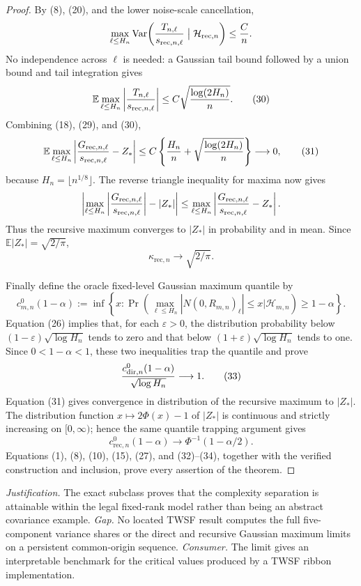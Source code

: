 \documentclass{article}
\begin{document}
\begin{proof}
By (8), (20), and the lower noise-scale cancellation,
\[
 \max_{\ell\leq H_n}
 \operatorname{Var}\!\left(
 {T_{n,\ell}\over s_{\mathrm{rec},n,\ell}}
 \mathrel{\big|}\mathcal H_{\mathrm{rec},n}\right)
 \leq {C\over n}.
\]
No independence across \(\ell\) is needed: a Gaussian tail bound followed by a union bound and tail integration gives
\[
 \mathbb E\max_{\ell\leq H_n}
 \left|{T_{n,\ell}\over s_{\mathrm{rec},n,\ell}}\right|
 \leq C\sqrt{{\log(2H_n)\over n}}.
 \tag{30}
\]
Combining (18), (29), and (30),
\[
 \mathbb E\max_{\ell\leq H_n}
 \left|{G_{\mathrm{rec},n,\ell}\over s_{\mathrm{rec},n,\ell}}-Z_*\right|
 \leq C\left\{{H_n\over n}
       +\sqrt{{\log(2H_n)\over n}}\right\}\longrightarrow0,
 \tag{31}
\]
because \(H_n=\lfloor n^{1/8}\rfloor\).  The reverse triangle inequality for maxima now gives
\[
 \left|\max_{\ell\leq H_n}
 \left|{G_{\mathrm{rec},n,\ell}\over s_{\mathrm{rec},n,\ell}}\right|-|Z_*|\right|
 \leq\max_{\ell\leq H_n}
 \left|{G_{\mathrm{rec},n,\ell}\over s_{\mathrm{rec},n,\ell}}-Z_*\right|.
\]
Thus the recursive maximum converges to \(|Z_*|\) in probability and in mean.  Since \(\mathbb E|Z_*|=\sqrt{2/\pi}\),
\[
 \kappa_{\mathrm{rec},n}\longrightarrow\sqrt{2/\pi}.
 \tag{32}
\]

Finally define the oracle fixed-level Gaussian maximum quantile by
\[
 c^0_{m,n}(1-\alpha)
 :=\inf\left\{x:\Pr\!\left(
 \max_{\ell\leq H_n}|N(0,R_{m,n})_\ell|\leq x
 \mathrel{\big|}\mathcal H_{m,n}\right)\geq1-\alpha\right\}.
\]
Equation (26) implies that, for each \(\varepsilon>0\), the distribution probability below \((1-\varepsilon)\sqrt{\log H_n}\) tends to zero and that below \((1+\varepsilon)\sqrt{\log H_n}\) tends to one.  Since \(0<1-\alpha<1\), these two inequalities trap the quantile and prove
\[
 {c^0_{\mathrm{dir},n}(1-\alpha)\over\sqrt{\log H_n}}
 \longrightarrow1.
 \tag{33}
\]
Equation (31) gives convergence in distribution of the recursive maximum to \(|Z_*|\).  The distribution function \(x\mapsto2\Phi(x)-1\) of \(|Z_*|\) is continuous and strictly increasing on \([0,\infty)\); hence the same quantile trapping argument gives
\[
 c^0_{\mathrm{rec},n}(1-\alpha)
 \longrightarrow\Phi^{-1}(1-\alpha/2).
 \tag{34}
\]
Equations (1), (8), (10), (15), (27), and (32)--(34), together with the verified construction and inclusion, prove every assertion of the theorem.
\end{proof}
\par\smallskip\noindent \textit{Justification.} The exact subclass proves that the complexity separation is attainable within the legal fixed-rank model rather than being an abstract covariance example. \textit{Gap.} No located TWSF result computes the full five-component variance shares or the direct and recursive Gaussian maximum limits on a persistent common-origin sequence. \textit{Consumer.} The limit gives an interpretable benchmark for the critical values produced by a TWSF ribbon implementation.
\end{document}
